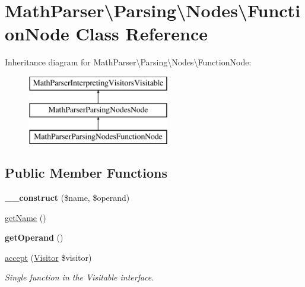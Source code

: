 \hypertarget{classMathParser_1_1Parsing_1_1Nodes_1_1FunctionNode}{\section{Math\-Parser\textbackslash{}Parsing\textbackslash{}Nodes\textbackslash{}Function\-Node Class Reference}
\label{classMathParser_1_1Parsing_1_1Nodes_1_1FunctionNode}
}
Inheritance diagram for Math\-Parser\textbackslash{}Parsing\textbackslash{}Nodes\textbackslash{}Function\-Node\-:\begin{figure}[H]
\begin{center}
\leavevmode
\includegraphics[height=3.000000cm]{classMathParser_1_1Parsing_1_1Nodes_1_1FunctionNode}
\end{center}
\end{figure}
\subsection*{Public Member Functions}
\begin{DoxyCompactItemize}
\item 
\hypertarget{classMathParser_1_1Parsing_1_1Nodes_1_1FunctionNode_a1e5f029d0dbac72b28d6d42048140b3b}{{\bfseries \-\_\-\-\_\-construct} (\$name, \$operand)}\label{classMathParser_1_1Parsing_1_1Nodes_1_1FunctionNode_a1e5f029d0dbac72b28d6d42048140b3b}

\item 
\hyperlink{classMathParser_1_1Parsing_1_1Nodes_1_1FunctionNode_a797c638dc3ef116100b5db449e7fb231}{get\-Name} ()
\item 
\hypertarget{classMathParser_1_1Parsing_1_1Nodes_1_1FunctionNode_acea27b2dadadaa202ddefb69fb3a2cdf}{{\bfseries get\-Operand} ()}\label{classMathParser_1_1Parsing_1_1Nodes_1_1FunctionNode_acea27b2dadadaa202ddefb69fb3a2cdf}

\item 
\hyperlink{classMathParser_1_1Parsing_1_1Nodes_1_1FunctionNode_a9796a0fdaf49525adc9ea539b4291835}{accept} (\hyperlink{interfaceMathParser_1_1Interpreting_1_1Visitors_1_1Visitor}{Visitor} \$visitor)
\begin{DoxyCompactList}\small\item\em Single function in the Visitable interface. \end{DoxyCompactList}\end{DoxyCompactItemize}
